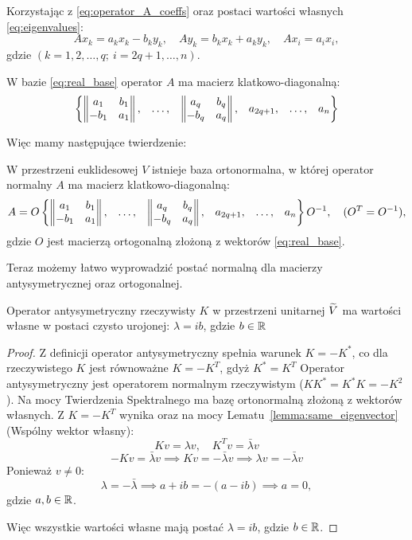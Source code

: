 Korzystając z \eqref{eq:operator_A_coeffs} oraz postaci wartości własnych \eqref{eq:eigenvalues}:
\begin{equation}\label{eq:op_A_in_real_base}
   Ax_k = a_k x_k - b_k y_k, \quad Ay_k = b_k x_k + a_k y_k, \quad Ax_i = a_i x_i, 
\end{equation}
gdzie $(k = 1, 2, \ldots, q; \ i = 2q + 1, \ldots, n)$.

W bazie \eqref{eq:real_base} operator $A$ ma macierz klatkowo-diagonalną:
\begin{equation}
\begin{Bmatrix}
\left\| \begin{matrix} a_1 & b_1\\ -b_1 & a_1 \end{matrix} \right\|,
&
\ldots,
&
\left\| \begin{matrix} a_q & b_q\\ -b_q & a_q \end{matrix} \right\|,
&
a_{2q+1},
&
\ldots,
&
a_n
\end{Bmatrix}
\end{equation}

Więc mamy następujące twierdzenie:
\begin{theorem}\label{theorem:real_normal_form}
    W przestrzeni euklidesowej $V$ istnieje baza ortonormalna, w której operator normalny $A$ ma macierz klatkowo-diagonalną:
\begin{equation}
   A = O
\begin{Bmatrix}
\left\| \begin{matrix} a_1 & b_1\\ -b_1 & a_1 \end{matrix} \right\|,
&
\ldots,
&
\left\| \begin{matrix} a_q & b_q\\ -b_q & a_q \end{matrix} \right\|,
&
a_{2q+1},
&
\ldots,
&
a_n
\end{Bmatrix}
O^{-1}, \quad (O^T = O^{-1}),
\end{equation}
gdzie $O$ jest macierzą ortogonalną złożoną z wektorów \eqref{eq:real_base}.
\end{theorem}

Teraz możemy łatwo wyprowadzić postać normalną dla macierzy antysymetrycznej oraz ortogonalnej.

\begin{theorem}
Operator antysymetryczny rzeczywisty $K$ w przestrzeni unitarnej $\widetilde{V}$ ma wartości własne w postaci czysto urojonej: $\lambda = ib$, gdzie $b \in \mathbb{R}$  
\end{theorem}
\begin{proof}
Z definicji operator antysymetryczny spełnia warunek $K = -K^*$, co dla rzeczywistego $K$ jest równoważne $K = -K^T$, gdyż $K^* = K^T$
Operator antysymetryczny jest operatorem normalnym rzeczywistym ($KK^* = K^*K = -K^2$).
Na mocy Twierdzenia Spektralnego ma bazę ortonormalną złożoną z wektorów własnych. 
Z $K = -K^T$ wynika oraz na mocy Lematu~\ref{lemma:same_eigenvector} (Wspólny wektor własny):
$$ Kv = \lambda v, \quad K^Tv = \bar{\lambda} v$$ 
$$ -Kv = \bar{\lambda} v \implies  Kv = -\bar{\lambda} v \implies \lambda v = -\bar{\lambda} v $$ 
Ponieważ $v \neq 0$:
$$ \lambda = -\bar{\lambda} \implies a + ib = -(a - ib) \implies a = 0,$$
gdzie $a, b \in \mathbb{R}$.

Więc wszystkie wartości własne mają postać $\lambda = ib$, gdzie $b \in \mathbb{R}$.
\end{proof}

